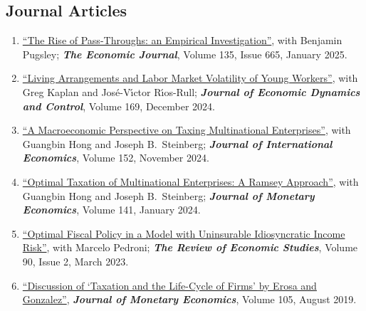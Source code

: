 \documentclass[letterpaper]{article}
\begin{document}
\subsection*{Journal Articles}
\begin{enumerate}
\item \href{https://dyrda.info/files/Dyrda_Pugsley_emplfo.pdf}{``The Rise of Pass-Throughs: an Empirical Investigation''}, with Benjamin Pugsley; \textbf{\emph{The Economic Journal}}, Volume 135, Issue 665, January 2025.
\item \href{https://dyrda.info/files/dkrr_jedc.pdf}{``Living Arrangements and Labor Market Volatility of Young Workers''}, with Greg Kaplan and Jos\'e-V\'{\i}ctor R\'{\i}os-Rull; \textbf{\emph{Journal of Economic Dynamics and Control}}, Volume 169, December 2024.
\item \href{https://dyrda.info/files/DyrdaHongSteinberg_TaxingMNEs.pdf}{``A Macroeconomic Perspective on Taxing Multinational Enterprises''}, with Guangbin Hong and Joseph B.\ Steinberg; \textbf{\emph{Journal of International Economics}}, Volume 152, November 2024.
\item \href{https://dyrda.info/files/DyrdaHongSteinberg_JME.pdf}{``Optimal Taxation of Multinational Enterprises: A Ramsey Approach''}, with Guangbin Hong and Joseph B.\ Steinberg; \textbf{\emph{Journal of Monetary Economics}}, Volume 141, January 2024.
\item \href{https://dyrda.info/files/DyrdaPedroni_restud.pdf}{``Optimal Fiscal Policy in a Model with Uninsurable Idiosyncratic Income Risk''}, with Marcelo Pedroni; \textbf{\emph{The Review of Economic Studies}}, Volume 90, Issue 2, March 2023.
\item \href{https://www.sciencedirect.com/science/article/abs/pii/S0304393219300790}{``Discussion of `Taxation and the Life-Cycle of Firms' by Erosa and Gonzalez''}, \textbf{\emph{Journal of Monetary Economics}}, Volume 105, August 2019.
\end{enumerate}
\end{document}
